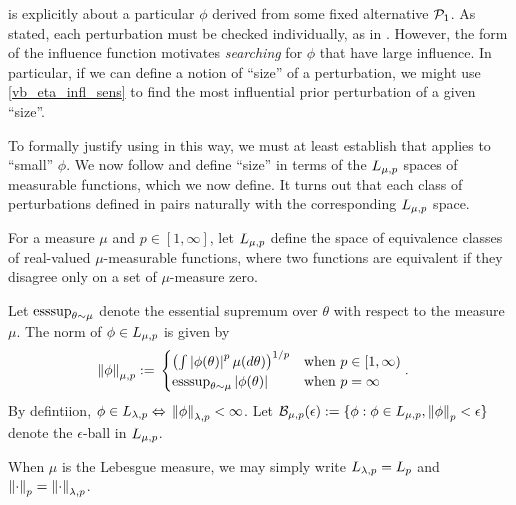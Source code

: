  is explicitly about a particular $\phi$ derived from
some fixed alternative $\mathcal{P}_{1}$.  As stated, each perturbation must be checked
individually, as in .  However, the form of the influence
function motivates {\em searching} for $\phi$ that have large influence. In
particular, if we can define a notion of ``size'' of a perturbation, we might
use \eqref{vb_eta_infl_sens} to find the most influential prior perturbation of
a given ``size''.


To formally justify using  in this way, we must at
least establish that  applies to ``small'' $\phi$. We
now follow \citet{gustafson:1996:local} and define ``size'' in terms of the
${L_{\mu, p}}$ spaces of measurable functions, which we now define.  It turns
out that each class of perturbations defined in 
pairs naturally with the corresponding ${L_{\mu,p}}$ space.


\begin{defn}
\citep[Sections 5.1-5.2]{dudley:2018:real}
%
For a measure $\mu$ and $p \in [1, \infty]$, let ${L_{\mu,p}}$ define the
space of equivalence classes of real-valued $\mu$-measurable functions,
where two functions are equivalent if they disagree only on a set of
$\mu$-measure zero.

Let $\operatorname*{\mathrm{esssup}}_{\theta\sim\mu}$ denote the essential supremum over $\theta$ with
respect to the measure $\mu$. The norm of $\phi \in {L_{\mu,p}}$ is given by
%
\begin{align*}
%
\norm{\phi}_{\mu,p} :={}&
\begin{cases}
    \left(\int \abs{\phi(\theta)}^p \mu(d\theta)\right)^{1/p}
    & \textrm{when }p \in [1, \infty)\\
    \esssup_{\theta\sim\mu} \abs{\phi(\theta)}
    & \textrm{when }p = \infty
\end{cases}.
%
\end{align*}
%
By defintiion, $\phi \in {L_{\lambda,p}} \Leftrightarrow{}
\left\Vert\phi\right\Vert_{\lambda,p} < \infty$.
%
Let $\mathcal{B}_{\mu,p}(\epsilon) := \{\phi: \phi \in {L_{\mu, p}},
\left\Vert\phi\right\Vert_p < \epsilon \}$ denote the $\epsilon$-ball in ${L_{\mu, p}}$.

When $\mu$ is the Lebesgue measure, we may
simply write ${L_{\lambda,p}} = {L_{p}}$ and $\left\Vert\cdot\right\Vert_{p} =
\left\Vert\cdot\right\Vert_{\lambda,p}$.
%
\end{defn}

